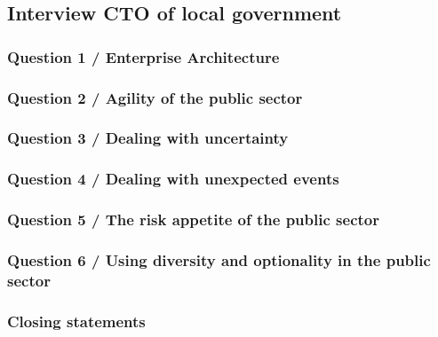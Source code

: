 \subsection{Interview CTO of local government}
\label{sub:interviewctolocal}

\subsubsection{Question 1 / Enterprise Architecture}

\subsubsection{Question 2 / Agility of the public sector}

\subsubsection{Question 3 / Dealing with uncertainty}

\subsubsection{Question 4 / Dealing with unexpected events}

\subsubsection{Question 5 / The risk appetite of the public sector}

\subsubsection{Question 6 / Using diversity and optionality in the public sector}

\subsubsection{Closing statements}